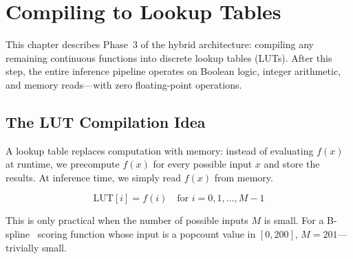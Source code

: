 \chapter{Compiling to Lookup Tables}
\label{ch:lut}

This chapter describes Phase~3 of the hybrid architecture: compiling
any remaining continuous functions into discrete lookup tables (LUTs).
After this step, the entire inference pipeline operates on Boolean
logic, integer arithmetic, and memory reads---with zero floating-point
operations.


\section{The LUT Compilation Idea}
\label{sec:lut-idea}

A lookup table replaces computation with memory: instead of evaluating
$f(x)$ at runtime, we precompute $f(x)$ for every possible input $x$
and store the results. At inference time, we simply read $f(x)$ from
memory.

\begin{equation}
  \text{LUT}[i] = f(i) \quad \text{for } i = 0, 1, \ldots, M{-}1
  \label{eq:lut-def}
\end{equation}

This is only practical when the number of possible inputs $M$ is
small. For a B-spline~\cite{deboor1978splines} scoring function whose input is a popcount
value in $[0, 200]$, $M = 201$---trivially small.

